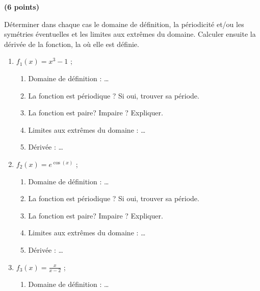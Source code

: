 \begin{exercice}\label{exoExosenvrac-0015}\textbf{ (6 points) }

Déterminer dans chaque cas le domaine de définition, la périodicité et/ou les symétries éventuelles et les limites aux extrêmes du domaine. Calculer ensuite la dérivée de la fonction, la où elle est définie.   
    
    \begin{enumerate}
    \item $\displaystyle f_1(x)= x^3-1$ ;
      \begin{enumerate}
      \item Domaine de définition : \ldots 
        \vspace{3mm}
      \item La fonction est périodique ? Si oui, trouver sa période.  
        \vspace{3mm}
      \item La fonction est paire? Impaire ? Expliquer.  
        \vspace{1cm}
      \item Limites aux extrêmes du domaine : \ldots
        \vspace{1cm}
      \item Dérivée : \ldots 
        \vspace{3mm}
      \end{enumerate}
    \item $\displaystyle f_2(x)= e^{\cos(x)}$ ;
      \begin{enumerate}
      \item Domaine de définition : \ldots 
        \vspace{3mm}
      \item La fonction est périodique ? Si oui, trouver sa période.  
        \vspace{3mm}
      \item La fonction est paire? Impaire ? Expliquer.  
        \vspace{1cm}
      \item Limites aux extrêmes du domaine : \ldots
        \vspace{1cm}
      \item Dérivée : \ldots 
        \vspace{3mm}
      \end{enumerate}
    \item $\displaystyle f_3(x)= \frac{x}{x-2}$ ;
      \begin{enumerate}
      \item Domaine de définition : \ldots 

\end{enumerate}
\end{enumerate}
\end{exercice}
